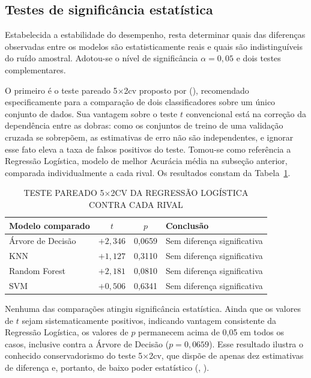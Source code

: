 \documentclass[
    12pt
    ,oneside
    ,a4paper
    ,chapter=TITLE
    ,section=TITLE
    ,sumario=abnt-6027-2012
    ,english,brazil]{abntex2} %
\begin{document}
\subsection{Testes de significância estatística}
\label{subsec:significancia}

Estabelecida a estabilidade do desempenho, resta determinar quais das diferenças
observadas entre os modelos são estatisticamente reais e quais são
indistinguíveis do ruído amostral. Adotou-se o nível de significância
$\alpha = 0{,}05$ e dois testes complementares.

O primeiro é o teste pareado 5$\times$2cv proposto por
 (\citeyear{Dietterich1998}), recomendado
especificamente para a comparação de dois classificadores sobre um único
conjunto de dados. Sua vantagem sobre o teste $t$ convencional está na correção
da dependência entre as dobras: como os conjuntos de treino de uma validação
cruzada se sobrepõem, as estimativas de erro não são independentes, e ignorar
esse fato eleva a taxa de falsos positivos do teste. Tomou-se como referência a
Regressão Logística, modelo de melhor Acurácia média na subseção anterior,
comparada individualmente a cada rival. Os resultados constam da
Tabela~\ref{tab:teste_5x2cv}.

\begin{table}[htbp]
    \centering
    \caption{TESTE PAREADO 5$\times$2CV DA REGRESSÃO LOGÍSTICA CONTRA CADA RIVAL}
    \label{tab:teste_5x2cv}
    \begin{tabular}{@{}lccl@{}}
        \toprule
        \textbf{Modelo comparado} & \textbf{$t$} & \textbf{$p$} & \textbf{Conclusão} \\
        \midrule
        Árvore de Decisão & $+2{,}346$ & 0,0659 & Sem diferença significativa \\
        KNN               & $+1{,}127$ & 0,3110 & Sem diferença significativa \\
        Random Forest     & $+2{,}181$ & 0,0810 & Sem diferença significativa \\
        SVM               & $+0{,}506$ & 0,6341 & Sem diferença significativa \\
        \bottomrule
    \end{tabular}
    \vspace{0.2cm}
    \fonteautor
\end{table}

Nenhuma das comparações atingiu significância estatística. Ainda que os valores
de $t$ sejam sistematicamente positivos, indicando vantagem consistente da
Regressão Logística, os valores de $p$ permanecem acima de 0,05 em todos os
casos, inclusive contra a Árvore de Decisão ($p = 0{,}0659$). Esse resultado
ilustra o conhecido conservadorismo do teste 5$\times$2cv, que dispõe de apenas
dez estimativas de diferença e, portanto, de baixo poder estatístico
(, \citeyear{Dietterich1998}).
\end{document}
